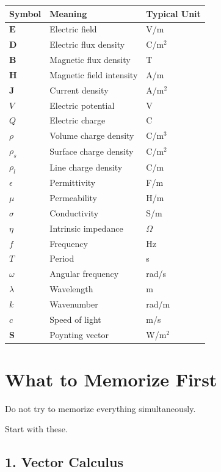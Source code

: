 \documentclass[11pt]{article}
\newcommand{\vect}[1]{\mathbf{#1}}
\begin{document}
\begin{center}
\begin{tabular}{lll}
\toprule
Symbol & Meaning & Typical Unit \\
\midrule
$\vect{E}$ & Electric field & V/m \\
$\vect{D}$ & Electric flux density & C/m$^2$ \\
$\vect{B}$ & Magnetic flux density & T \\
$\vect{H}$ & Magnetic field intensity & A/m \\
$\vect{J}$ & Current density & A/m$^2$ \\
$V$ & Electric potential & V \\
$Q$ & Electric charge & C \\
$\rho$ & Volume charge density & C/m$^3$ \\
$\rho_s$ & Surface charge density & C/m$^2$ \\
$\rho_l$ & Line charge density & C/m \\
$\epsilon$ & Permittivity & F/m \\
$\mu$ & Permeability & H/m \\
$\sigma$ & Conductivity & S/m \\
$\eta$ & Intrinsic impedance & $\Omega$ \\
$f$ & Frequency & Hz \\
$T$ & Period & s \\
$\omega$ & Angular frequency & rad/s \\
$\lambda$ & Wavelength & m \\
$k$ & Wavenumber & rad/m \\
$c$ & Speed of light & m/s \\
$\vect{S}$ & Poynting vector & W/m$^2$ \\
\bottomrule
\end{tabular}
\end{center}



\section{What to Memorize First}

Do not try to memorize everything simultaneously.

Start with these.

\subsection*{1. Vector Calculus}
\end{document}
